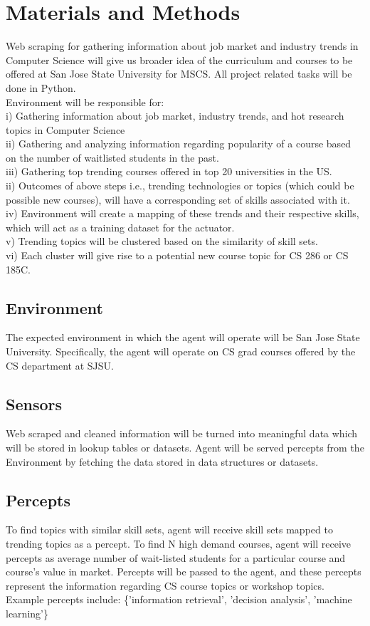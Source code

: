 \documentclass{article}
\begin{document}
\section{Materials and Methods}
Web scraping for gathering information about job market and industry trends in Computer Science will give us broader idea of the curriculum and courses to be offered at San Jose State University for MSCS. All project related tasks will be done in Python. \\
Environment will be responsible for: \\
i)  Gathering information about job market, industry trends, and hot research topics in Computer Science \\
ii) Gathering and analyzing information regarding popularity of a course based on the number of waitlisted students in the past. \\
iii) Gathering top trending courses offered in top 20 universities in the US. \\
ii) Outcomes of above steps i.e., trending technologies or topics (which could be possible new courses), will have a corresponding set of skills associated with it. \\
iv) Environment will create a mapping of these trends and their respective skills, which will act as a training dataset for the actuator. \\
v) Trending topics will be clustered based on the similarity of skill sets. \\
vi) Each cluster will give rise to a potential new course topic for CS 286 or CS 185C. 

\subsection{Environment}
The expected environment in which the agent will operate will be San Jose State University. Specifically, the agent will operate on CS grad courses offered by the CS department at SJSU. 

\subsection{Sensors}
Web scraped and cleaned information will be turned into meaningful data which will be stored in lookup tables or datasets.
Agent will be served percepts from the Environment by fetching the data stored in data structures or datasets. 

\subsection{Percepts}
To find topics with similar skill sets, agent will receive skill sets mapped to trending topics as a percept.
To find N high demand courses, agent will receive percepts as average number of wait-listed students for a particular course and course's value in market. Percepts will be passed to the agent, and these percepts represent the information regarding CS course topics or workshop topics. Example percepts include: 
\{'information retrieval', 'decision analysis', 'machine learning'\}
\end{document}
